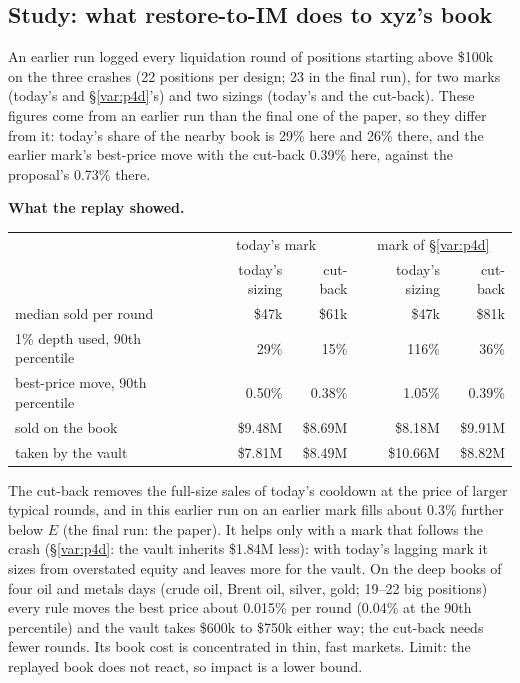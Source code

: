 \documentclass[10.5pt,a4paper]{article}
\newcommand{\res}[1]{\par\textbf{What the replay showed.} #1\par}
\begin{document}
\subsection{Study: what restore-to-IM does to xyz's book}\label{var:auto15}
An earlier run logged every liquidation round of positions starting above \$100k on the three crashes (22 positions per design; 23 in the final run), for two marks (today's and \S\ref{var:p4d}'s) and two sizings (today's and the cut-back).
These figures come from an earlier run than the final one of the paper, so they differ from it: today's share of the nearby book is 29\% here and 26\% there, and the earlier mark's best-price move with the cut-back 0.39\% here, against the proposal's 0.73\% there.\par
\res{\par{\footnotesize\begin{tabular}{@{}lrrrr@{}}
\toprule
 & \multicolumn{2}{c}{today's mark} & \multicolumn{2}{c}{mark of \S\ref{var:p4d}}\\
 & today's sizing & cut-back & today's sizing & cut-back\\
\midrule
median sold per round & \$47k & \$61k & \$47k & \$81k\\
1\% depth used, 90th percentile & 29\% & 15\% & 116\% & 36\%\\
best-price move, 90th percentile & 0.50\% & 0.38\% & 1.05\% & 0.39\%\\
sold on the book & \$9.48M & \$8.69M & \$8.18M & \$9.91M\\
taken by the vault & \$7.81M & \$8.49M & \$10.66M & \$8.82M\\
\bottomrule
\end{tabular}}\par
The cut-back removes the full-size sales of today's cooldown at the price of larger typical rounds, and in this earlier run on an earlier mark fills about 0.3\% further below $E$ (the final run: the paper). It helps only with a mark that follows the crash (\S\ref{var:p4d}: the vault inherits \$1.84M less): with today's lagging mark it sizes from overstated equity and leaves more for the vault. On the deep books of four oil and metals days (crude oil, Brent oil, silver, gold; 19--22 big positions) every rule moves the best price about 0.015\% per round (0.04\% at the 90th percentile) and the vault takes \$600k to \$750k either way; the cut-back needs fewer rounds. Its book cost is concentrated in thin, fast markets. Limit: the replayed book does not react, so impact is a lower bound.}
\end{document}
